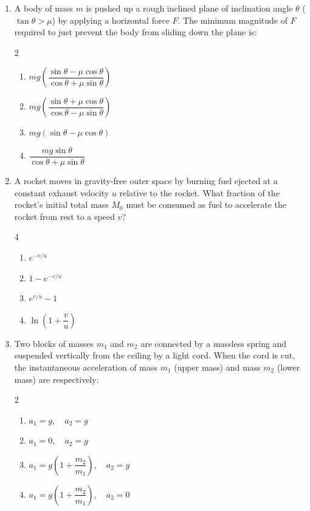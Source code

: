 \documentclass[11pt,a4paper]{article}
\begin{document}
\begin{enumerate}[label=\textbf{\arabic*.},leftmargin=18pt,itemsep=8pt,resume]
  \item A body of mass $m$ is pushed up a rough inclined plane of inclination angle $\theta$ ($\tan\theta > \mu$) by applying a horizontal force $F$. The minimum magnitude of $F$ required to just prevent the body from sliding down the plane is:
  \begin{multicols}{2}
    \begin{enumerate}[label=(\Alph*)]
      \item $mg\left(\dfrac{\sin\theta - \mu\cos\theta}{\cos\theta + \mu\sin\theta}\right)$
      \item $mg\left(\dfrac{\sin\theta + \mu\cos\theta}{\cos\theta - \mu\sin\theta}\right)$
      \item $mg(\sin\theta - \mu\cos\theta)$
      \item $\dfrac{mg\sin\theta}{\cos\theta + \mu\sin\theta}$
    \end{enumerate}
  \end{multicols}

  \item A rocket moves in gravity-free outer space by burning fuel ejected at a constant exhaust velocity $u$ relative to the rocket. What fraction of the rocket's initial total mass $M_0$ must be consumed as fuel to accelerate the rocket from rest to a speed $v$?
  \begin{multicols}{4}
    \begin{enumerate}[label=(\Alph*)]
      \item $e^{-v/u}$
      \item $1 - e^{-v/u}$
      \item $e^{v/u} - 1$
      \item $\ln\left(1 + \dfrac{v}{u}\right)$
    \end{enumerate}
  \end{multicols}

  \item Two blocks of masses $m_1$ and $m_2$ are connected by a massless spring and suspended vertically from the ceiling by a light cord. When the cord is cut, the instantaneous acceleration of mass $m_1$ (upper mass) and mass $m_2$ (lower mass) are respectively:
  \begin{multicols}{2}
    \begin{enumerate}[label=(\Alph*)]
      \item $a_1 = g, \quad a_2 = g$
      \item $a_1 = 0, \quad a_2 = g$
      \item $a_1 = g\left(1 + \dfrac{m_2}{m_1}\right), \quad a_2 = g$
      \item $a_1 = g\left(1 + \dfrac{m_2}{m_1}\right), \quad a_2 = 0$
    \end{enumerate}
  \end{multicols}


\end{enumerate}
\end{document}
